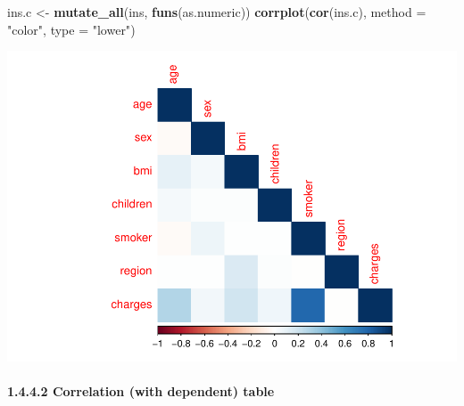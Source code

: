 \documentclass[]{article}
\newenvironment{Shaded}{\begin{snugshade}}{\end{snugshade}}
\newcommand{\KeywordTok}[1]{\textcolor[rgb]{0.13,0.29,0.53}{\textbf{#1}}}
\newcommand{\DataTypeTok}[1]{\textcolor[rgb]{0.13,0.29,0.53}{#1}}
\newcommand{\DecValTok}[1]{\textcolor[rgb]{0.00,0.00,0.81}{#1}}
\newcommand{\StringTok}[1]{\textcolor[rgb]{0.31,0.60,0.02}{#1}}
\newcommand{\ControlFlowTok}[1]{\textcolor[rgb]{0.13,0.29,0.53}{\textbf{#1}}}
\newcommand{\OperatorTok}[1]{\textcolor[rgb]{0.81,0.36,0.00}{\textbf{#1}}}
\newcommand{\NormalTok}[1]{#1}
\let\oldparagraph\paragraph
\renewcommand{\paragraph}[1]{\oldparagraph{#1}\mbox{}}
\begin{document}
\begin{Shaded}
\begin{Highlighting}[]
\NormalTok{ins.c <-}\StringTok{ }\KeywordTok{mutate_all}\NormalTok{(ins, }\KeywordTok{funs}\NormalTok{(as.numeric))}
\KeywordTok{corrplot}\NormalTok{(}\KeywordTok{cor}\NormalTok{(ins.c), }\DataTypeTok{method =} \StringTok{"color"}\NormalTok{, }\DataTypeTok{type =} \StringTok{"lower"}\NormalTok{)}
\end{Highlighting}
\end{Shaded}

\includegraphics{DATA_605_Discussion_12_files/figure-latex/summary-correlation-heatmap-1.pdf}

\paragraph{1.4.4.2 Correlation (with dependent)
table}\label{correlation-with-dependent-table}

\begin{Shaded}
\end{Shaded}
\end{document}
